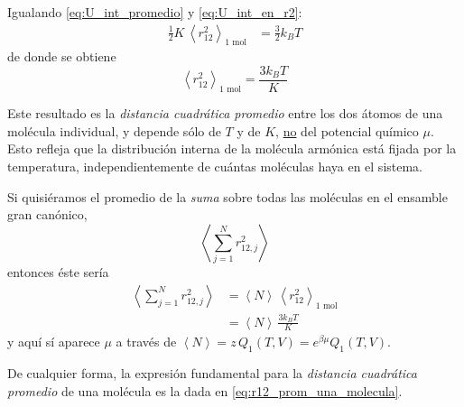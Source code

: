 \documentclass{article}
\begin{document}
Igualando \eqref{eq:U_int_promedio} y \eqref{eq:U_int_en_r2}:
\begin{equation}
\begin{split}
\frac{1}{2}K\,\left\langle r_{12}^{2}\right\rangle_{\text{1 mol}}
&= \frac{3}{2}k_{B}T
\end{split}\label{eq:igualando_ener}
\end{equation}
de donde se obtiene
\begin{equation}
\boxed{
\left\langle r_{12}^{2}\right\rangle_{\text{1 mol}}
= \frac{3k_{B}T}{K}
}
\label{eq:r12_prom_una_molecula}
\end{equation}

Este resultado es la \emph{distancia cuadrática promedio} entre los dos átomos
de una molécula individual, y depende sólo de \(T\) y de \(K\), \underline{no}
del potencial químico \(\mu\). Esto refleja que la distribución interna de la
molécula armónica está fijada por la temperatura, independientemente de cuántas
moléculas haya en el sistema.

Si quisiéramos el promedio de la \emph{suma} sobre todas las moléculas en el
ensamble gran canónico,
\[
\left\langle \sum_{j=1}^{N} r_{12,j}^{2} \right\rangle
\]
entonces éste sería
\begin{equation}
\begin{split}
\left\langle \sum_{j=1}^{N} r_{12,j}^{2} \right\rangle
&= \left\langle N \right\rangle\,
\left\langle r_{12}^{2}\right\rangle_{\text{1 mol}} \\[4pt]
&= \left\langle N \right\rangle\,
\frac{3k_{B}T}{K}
\end{split}\label{eq:sum_r2_total}
\end{equation}
y aquí sí aparece \(\mu\) a través de
\(\left\langle N \right\rangle = z\,Q_{1}(T,V) = e^{\beta\mu}Q_{1}(T,V)\).  

De cualquier forma, la expresión fundamental para la \emph{distancia cuadrática
promedio} de una molécula es la dada en \eqref{eq:r12_prom_una_molecula}.
\end{document}
